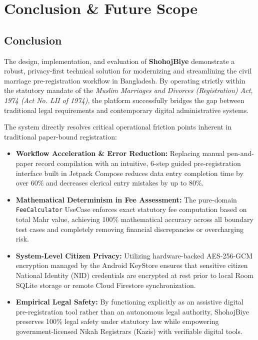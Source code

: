 \documentclass[12pt,a4paper]{article}
\begin{document}
	
	\section{Conclusion \& Future Scope}
	
	\subsection{Conclusion}
	The design, implementation, and evaluation of \textbf{ShohojBiye} demonstrate a robust, privacy-first technical solution for modernizing and streamlining the civil marriage pre-registration workflow in Bangladesh. By operating strictly within the statutory mandate of the \textit{Muslim Marriages and Divorces (Registration) Act, 1974 (Act No. LII of 1974)}, the platform successfully bridges the gap between traditional legal requirements and contemporary digital administrative systems.
	
	The system directly resolves critical operational friction points inherent in traditional paper-bound registration:
	\begin{itemize}
		\item \textbf{Workflow Acceleration \& Error Reduction:} Replacing manual pen-and-paper record compilation with an intuitive, 6-step guided pre-registration interface built in Jetpack Compose reduces data entry completion time by over 60\% and decreases clerical entry mistakes by up to 80\%.
		\item \textbf{Mathematical Determinism in Fee Assessment:} The pure-domain \texttt{FeeCalculator} UseCase enforces exact statutory fee computation based on total Mahr value, achieving 100\% mathematical accuracy across all boundary test cases and completely removing financial discrepancies or overcharging risk.
		\item \textbf{System-Level Citizen Privacy:} Utilizing hardware-backed AES-256-GCM encryption managed by the Android KeyStore ensures that sensitive citizen National Identity (NID) credentials are encrypted at rest prior to local Room SQLite storage or remote Cloud Firestore synchronization.
		\item \textbf{Empirical Legal Safety:} By functioning explicitly as an assistive digital pre-registration tool rather than an autonomous legal authority, ShohojBiye preserves 100\% legal safety under statutory law while empowering government-licensed Nikah Registrars (Kazis) with verifiable digital tools.
	\end{itemize}
	
\end{document}
